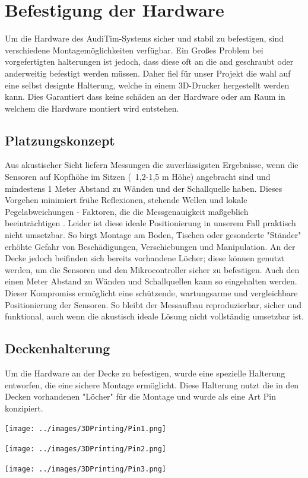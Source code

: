 \chapter{Befestigung der Hardware}
\label{chap:hardware-mounting}
Um die Hardware des AudiTim-Systems sicher und stabil zu befestigen, sind verschiedene Montagemöglichkeiten verfügbar. 
Ein Großes Problem bei vorgefertigten halterungen ist jedoch, dass diese oft an die and geschraubt oder anderweitig befestigt werden müssen.
Daher fiel für unser Projekt die wahl auf eine selbst designte Halterung, welche in einem 3D-Drucker hergestellt werden kann.
Dies Garantiert dass keine schäden an der Hardware oder am Raum in welchem die Hardware montiert wird entstehen.

\section{Platzungskonzept}
Aus akustischer Sicht liefern Messungen die zuverlässigsten Ergebnisse, wenn die Sensoren auf Kopfhöhe im Sitzen (~1,2-1,5 m Höhe) angebracht sind und mindestens 1 Meter Abstand zu Wänden und der Schallquelle haben. 
Dieses Vorgehen minimiert frühe Reflexionen, stehende Wellen und lokale Pegelabweichungen - Faktoren, die die Messgenauigkeit maßgeblich beeinträchtigen \cite{oltheten2019micplacement} .
Leider ist diese ideale Positionierung in unserem Fall praktisch nicht umsetzbar. So birgt Montage am Boden, Tischen oder gesonderte "Ständer" erhöhte Gefahr von Beschädigungen, Verschiebungen und Manipulation.
An der Decke jedoch beifinden sich bereits vorhandene Löcher; diese können genutzt werden, um die Sensoren und den Mikrocontroller sicher zu befestigen. 
Auch den einen Meter Abstand zu Wänden und Schallquellen kann so eingehalten werden.
Dieser Kompromiss ermöglicht eine schützende, wartungsarme und vergleichbare Positionierung der Sensoren.
So bleibt der Messaufbau reproduzierbar, sicher und funktional, auch wenn die akustisch ideale Lösung nicht vollständig umsetzbar ist.

\section{Deckenhalterung}
Um die Hardware an der Decke zu befestigen, wurde eine spezielle Halterung entworfen, die eine sichere Montage ermöglicht.
Diese Halterung nutzt die in den Decken vorhandenen "Löcher" für die Montage und wurde als eine Art Pin konzipiert.

\begin{center}
  \begin{minipage}[b]{0.32\textwidth}
    \texttt{[image: ../images/3DPrinting/Pin1.png]}
  \end{minipage}
  \hfill
  \begin{minipage}[b]{0.32\textwidth}
    \texttt{[image: ../images/3DPrinting/Pin2.png]}
  \end{minipage}
  \hfill
  \begin{minipage}[b]{0.32\textwidth}
    \texttt{[image: ../images/3DPrinting/Pin3.png]}
  \end{minipage}
\end{center}

